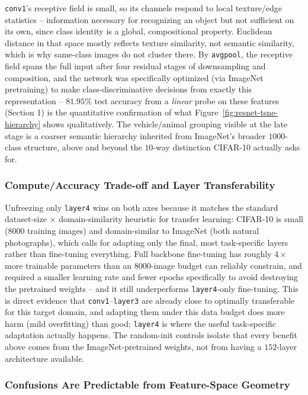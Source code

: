 \texttt{conv1}'s receptive field is small, so its channels respond to
local texture/edge statistics -- information necessary for recognizing an
object but not sufficient on its own, since class identity is a global,
compositional property. Euclidean distance in that space mostly reflects
texture similarity, not semantic similarity, which is why same-class images
do not cluster there. By \texttt{avgpool}, the receptive field spans the
full input after four residual stages of downsampling and composition, and
the network was specifically optimized (via ImageNet pretraining) to make
class-discriminative decisions from exactly this representation --
$81.95\%$ test accuracy from a \emph{linear} probe on these features
(Section 1) is the quantitative confirmation of what
Figure~\ref{fig:resnet-tsne-hierarchy} shows qualitatively. The
vehicle/animal grouping visible at the late stage is a coarser semantic
hierarchy inherited from ImageNet's broader $1000$-class structure, above
and beyond the $10$-way distinction CIFAR-10 actually asks for.

\subsubsection{Compute/Accuracy Trade-off and Layer Transferability}

Unfreezing only \texttt{layer4} wins on both axes because it matches the
standard dataset-size $\times$ domain-similarity heuristic for transfer
learning: CIFAR-10 is small ($8000$ training images) and domain-similar to
ImageNet (both natural photographs), which calls for adapting only the
final, most task-specific layers rather than fine-tuning everything. Full
backbone fine-tuning has roughly $4\times$ more trainable parameters than
an $8000$-image budget can reliably constrain, and required a smaller
learning rate and fewer epochs specifically to avoid destroying the
pretrained weights -- and it still underperforms \texttt{layer4}-only
fine-tuning. This is direct evidence that \texttt{conv1}--\texttt{layer3}
are already close to optimally transferable for this target domain, and
adapting them under this data budget does more harm (mild overfitting)
than good; \texttt{layer4} is where the useful task-specific adaptation
actually happens. The random-init controls isolate that every benefit
above comes from the ImageNet-pretrained weights, not from having a
$152$-layer architecture available.

\subsubsection{Confusions Are Predictable from Feature-Space Geometry}

